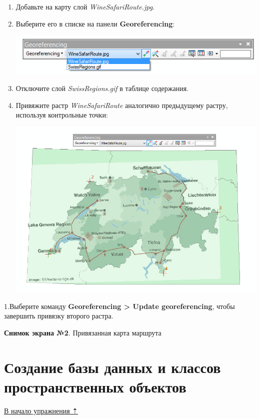 \documentclass[12pt,]{book}
\begin{document}
\begin{enumerate}
\def\labelenumi{\arabic{enumi}.}
\item
  Добавьте на карту слой \emph{WineSafariRoute.jpg}.
\item
  Выберите его в списке на панели \textbf{Georeferencing}:

  \includegraphics{images/Ex05/image12.png}
\item
  Отключите слой \emph{SwissRegions.gif} в таблице содержания.
\item
  Привяжите растр \emph{WineSafariRoute} аналогично предыдущему растру, используя контрольные точки:

  \includegraphics{images/Ex05/image13.png}
\end{enumerate}

1.Выберите команду \textbf{Georeferencing \textgreater{} Update georeferencing}, чтобы завершить привязку второго растра.

\textbf{Снимок экрана №2}. Привязанная карта маршрута

\hypertarget{map-ref-general-geodatabase}{%
\section{Создание базы данных и классов пространственных объектов}\label{map-ref-general-geodatabase}}

\protect\hyperlink{map-ref-general}{В начало упражнения ⇡}
\end{document}
